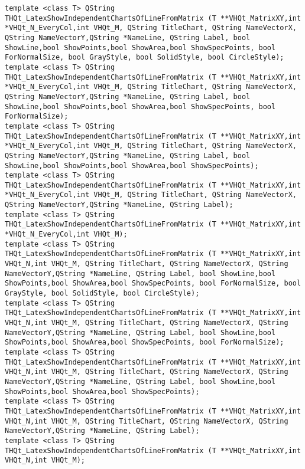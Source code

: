 \documentclass[a4paper,12pt]{article}
\begin{document}
\begin{lstlisting}[label=code_syntax_THQt_LatexShowIndependentChartsOfLineFromMatrix,caption=Синтаксис]
template <class T> QString THQt_LatexShowIndependentChartsOfLineFromMatrix (T **VHQt_MatrixXY,int *VHQt_N_EveryCol,int VHQt_M, QString TitleChart, QString NameVectorX, QString NameVectorY,QString *NameLine, QString Label, bool ShowLine,bool ShowPoints,bool ShowArea,bool ShowSpecPoints, bool ForNormalSize, bool GrayStyle, bool SolidStyle, bool CircleStyle);
template <class T> QString THQt_LatexShowIndependentChartsOfLineFromMatrix (T **VHQt_MatrixXY,int *VHQt_N_EveryCol,int VHQt_M, QString TitleChart, QString NameVectorX, QString NameVectorY,QString *NameLine, QString Label, bool ShowLine,bool ShowPoints,bool ShowArea,bool ShowSpecPoints, bool ForNormalSize);
template <class T> QString THQt_LatexShowIndependentChartsOfLineFromMatrix (T **VHQt_MatrixXY,int *VHQt_N_EveryCol,int VHQt_M, QString TitleChart, QString NameVectorX, QString NameVectorY,QString *NameLine, QString Label, bool ShowLine,bool ShowPoints,bool ShowArea,bool ShowSpecPoints);
template <class T> QString THQt_LatexShowIndependentChartsOfLineFromMatrix (T **VHQt_MatrixXY,int *VHQt_N_EveryCol,int VHQt_M, QString TitleChart, QString NameVectorX, QString NameVectorY,QString *NameLine, QString Label);
template <class T> QString THQt_LatexShowIndependentChartsOfLineFromMatrix (T **VHQt_MatrixXY,int *VHQt_N_EveryCol,int VHQt_M);
template <class T> QString THQt_LatexShowIndependentChartsOfLineFromMatrix (T **VHQt_MatrixXY,int VHQt_N,int VHQt_M, QString TitleChart, QString NameVectorX, QString NameVectorY,QString *NameLine, QString Label, bool ShowLine,bool ShowPoints,bool ShowArea,bool ShowSpecPoints, bool ForNormalSize, bool GrayStyle, bool SolidStyle, bool CircleStyle);
template <class T> QString THQt_LatexShowIndependentChartsOfLineFromMatrix (T **VHQt_MatrixXY,int VHQt_N,int VHQt_M, QString TitleChart, QString NameVectorX, QString NameVectorY,QString *NameLine, QString Label, bool ShowLine,bool ShowPoints,bool ShowArea,bool ShowSpecPoints, bool ForNormalSize);
template <class T> QString THQt_LatexShowIndependentChartsOfLineFromMatrix (T **VHQt_MatrixXY,int VHQt_N,int VHQt_M, QString TitleChart, QString NameVectorX, QString NameVectorY,QString *NameLine, QString Label, bool ShowLine,bool ShowPoints,bool ShowArea,bool ShowSpecPoints);
template <class T> QString THQt_LatexShowIndependentChartsOfLineFromMatrix (T **VHQt_MatrixXY,int VHQt_N,int VHQt_M, QString TitleChart, QString NameVectorX, QString NameVectorY,QString *NameLine, QString Label);
template <class T> QString THQt_LatexShowIndependentChartsOfLineFromMatrix (T **VHQt_MatrixXY,int VHQt_N,int VHQt_M);
\end{lstlisting}
\end{document}
